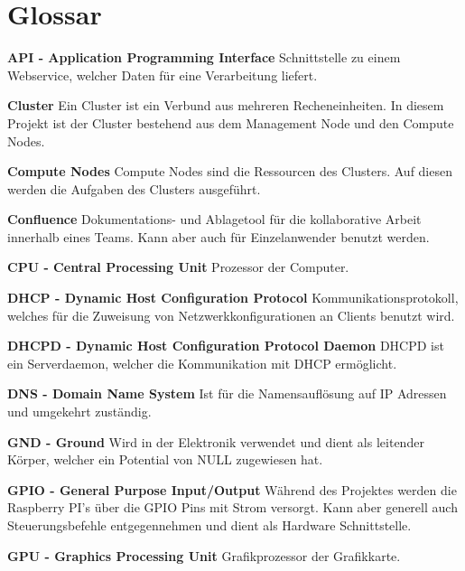 \section*{Glossar}
\textbf{API - Application Programming Interface} \newline
Schnittstelle zu einem Webservice, welcher Daten für eine Verarbeitung liefert.

\textbf{Cluster}\newline
Ein Cluster ist ein Verbund aus mehreren Recheneinheiten. In diesem Projekt ist der Cluster bestehend aus dem Management Node und den Compute Nodes.

\textbf{Compute Nodes}\newline
Compute Nodes sind die Ressourcen des Clusters. Auf diesen werden die Aufgaben des Clusters ausgeführt.

\textbf{Confluence}\newline
Dokumentations- und Ablagetool für die kollaborative Arbeit innerhalb eines Teams. Kann aber auch für Einzelanwender benutzt werden. 

\textbf{CPU - Central Processing Unit}\newline
Prozessor der Computer.

\textbf{DHCP - Dynamic Host Configuration Protocol}\newline
Kommunikationsprotokoll, welches für die Zuweisung von Netzwerkkonfigurationen an Clients benutzt wird.

\textbf{DHCPD - Dynamic Host Configuration Protocol Daemon}\newline
DHCPD ist ein Serverdaemon, welcher die Kommunikation mit DHCP ermöglicht.

\textbf{DNS - Domain Name System}\newline
Ist für die Namensauflösung auf IP Adressen und umgekehrt zuständig.

\textbf{GND - Ground}\newline
Wird in der Elektronik verwendet und dient als leitender Körper, welcher ein Potential von NULL zugewiesen hat. 

\textbf{GPIO - General Purpose Input/Output}\newline
Während des Projektes werden die Raspberry PI's über die GPIO Pins mit Strom versorgt. Kann aber generell auch Steuerungsbefehle entgegennehmen und dient als Hardware Schnittstelle.

\textbf{GPU - Graphics Processing Unit}\newline
Grafikprozessor der Grafikkarte.

